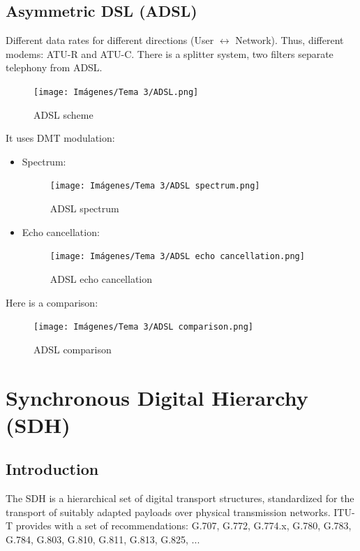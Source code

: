 \documentclass[
	12pt,
	twoside
]{book}
\begin{document}
\subsection{Asymmetric DSL (ADSL)}

Different data rates for different directions (User $\leftrightarrow$ Network). Thus, different modems: ATU-R and ATU-C. There is a splitter system, two filters separate telephony from ADSL.

\begin{figure}[H]
	\centering
	\texttt{[image: Imágenes/Tema 3/ADSL.png]}
	\caption{
		\label{fig:unit3_ADSL_scheme}
		ADSL scheme
	}
\end{figure}

It uses DMT modulation:

\begin{itemize}
	\item {
		Spectrum:

		\begin{figure}[H]
			\centering
			\texttt{[image: Imágenes/Tema 3/ADSL spectrum.png]}
			\caption{
				\label{fig:unit3_ADSL_spectrum}
				ADSL spectrum
			}
		\end{figure}
	}
	\item {
		Echo cancellation:

		\begin{figure}[H]
			\centering
			\texttt{[image: Imágenes/Tema 3/ADSL echo cancellation.png]}
			\caption{
				\label{fig:unit3_ADSL_echo}
				ADSL echo cancellation
			}
		\end{figure}
	}
\end{itemize}

Here is a comparison:

\begin{figure}[H]
	\centering
	\texttt{[image: Imágenes/Tema 3/ADSL comparison.png]}
	\caption{
		\label{fig:unit3_ADSL_comparison}
		ADSL comparison
	}
\end{figure}

\section{Synchronous Digital Hierarchy (SDH)}

\subsection{Introduction}

The SDH is a hierarchical set of digital transport structures, standardized for the transport of suitably adapted payloads over physical transmission networks. ITU-T provides with a set of recommendations: G.707, G.772, G.774.x, G.780, G.783, G.784, G.803, G.810, G.811, G.813, G.825, ...
\end{document}
